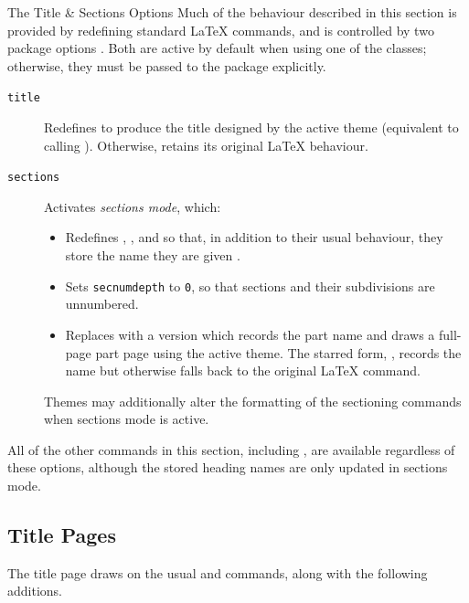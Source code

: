 		\begin{RpgSidebar}{The Title \& Sections Options}
			Much of the behaviour described in this section is provided by redefining standard \LaTeX{} commands, and is controlled by two package options . Both are active by default when using one of the \rpgtex{} classes; otherwise, they must be passed to the package explicitly.
			\begin{description}
				\item[\texttt{title}] Redefines  to produce the title designed by the active theme (equivalent to calling ). Otherwise,  retains its original \LaTeX{} behaviour.
				\item[\texttt{sections}] Activates \emph{sections mode}, which:
				      \begin{itemize}
					      \item Redefines , ,  and  so that, in addition to their usual behaviour, they store the name they are given .
					      \item Sets \texttt{secnumdepth} to \texttt{0}, so that sections and their subdivisions are unnumbered.
					      \item Replaces  with a version which records the part name and draws a full-page part page using the active theme. The starred form, , records the name but otherwise falls back to the original \LaTeX{} command.
				      \end{itemize}
				      Themes may additionally alter the formatting of the sectioning commands when sections mode is active.
			\end{description}
			All of the other commands in this section, including , are available regardless of these options, although the stored heading names are only updated in sections mode.
		\end{RpgSidebar}

		\subsection{Title Pages}\label{S:TitlePages}

			The title page draws on the usual  and  commands, along with the following additions.

